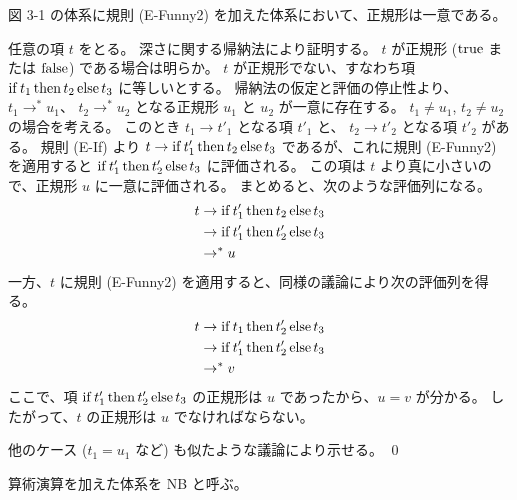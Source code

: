 \begin{jtheorem}[正規形の一意性]
  図 3-1 の体系に規則 (E-Funny2) を加えた体系において、正規形は一意である。
\end{jtheorem}
\begin{jproof}
  任意の項 $t$ をとる。
  深さに関する帰納法により証明する。
  $t$ が正規形 ($\operatorname{true}$ または $\operatorname{false}$) である場合は明らか。
  $t$ が正規形でない、すなわち項 $\operatorname{if} t_1 \operatorname{then} t_2 \operatorname{else} t_3$ に等しいとする。
  帰納法の仮定と評価の停止性より、
    $t_1 \to^* u_1$、
    $t_2 \to^* u_2$
  となる正規形 $u_1$ と $u_2$ が一意に存在する。
  $t_1 \not= u_1$, $t_2 \not= u_2$ の場合を考える。
  このとき
    $t_1 \to t'_1$ となる項 $t'_1$ と、
    $t_2 \to t'_2$ となる項 $t'_2$
  がある。
  規則 (E-If) より $t \to \operatorname{if} t'_1 \operatorname{then} t_2 \operatorname{else} t_3$ であるが、これに規則 (E-Funny2) を適用すると $\operatorname{if} t'_1 \operatorname{then} t'_2 \operatorname{else} t_3$ に評価される。
  この項は $t$ より真に小さいので、正規形 $u$ に一意に評価される。
  まとめると、次のような評価列になる。
  \begin{align*}
    t
    & \to \operatorname{if} t'_1 \operatorname{then} t_2 \operatorname{else} t_3
    \\ & \to \operatorname{if} t'_1 \operatorname{then} t'_2 \operatorname{else} t_3
    \\ & \to^* u
  \end{align*}
  一方、$t$ に規則 (E-Funny2) を適用すると、同様の議論により次の評価列を得る。
  \begin{align*}
    t
    & \to \operatorname{if} t_1 \operatorname{then} t'_2 \operatorname{else} t_3
    \\ & \to \operatorname{if} t'_1 \operatorname{then} t'_2 \operatorname{else} t_3
    \\ & \to^* v
  \end{align*}
  ここで、項 $\operatorname{if} t'_1 \operatorname{then} t'_2 \operatorname{else} t_3$ の正規形は $u$ であったから、$u = v$ が分かる。
  したがって、$t$ の正規形は $u$ でなければならない。

  他のケース ($t_1 = u_1$ など) も似たような議論により示せる。
  \qed
\end{jproof}

算術演算を加えた体系を NB と呼ぶ。

